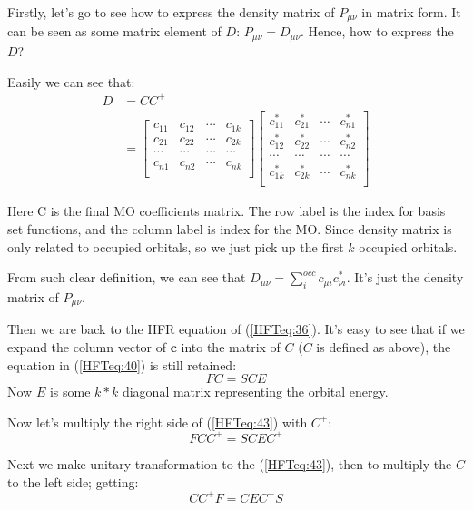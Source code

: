 Firstly, let's go to see how to express the density matrix of
$P_{\mu\nu}$ in matrix form. It can be seen as some matrix
element of $D$: $P_{\mu\nu} = D_{\mu\nu}$. Hence, how to express
the $D$?

Easily we can see that:
\begin{align}\label{}
D &= CC^{+} \nonumber \\
&=
\begin{bmatrix}
  c_{11} & c_{12} & \cdots & c_{1k} \\
  c_{21} & c_{22} & \cdots & c_{2k} \\
  \cdots & \cdots & \cdots & \cdots \\
  c_{n1} & c_{n2} & \cdots & c_{nk} \\
\end{bmatrix}
\begin{bmatrix}
  c^{*}_{11} & c^{*}_{21} & \cdots & c^{*}_{n1} \\
  c^{*}_{12} & c^{*}_{22} & \cdots & c^{*}_{n2} \\
  \cdots & \cdots & \cdots & \cdots \\
  c^{*}_{1k} & c^{*}_{2k} & \cdots & c^{*}_{nk} \\
\end{bmatrix}
\end{align}

Here C is the final MO coefficients matrix. The row label is the index for
basis set functions, and the column label is index for the MO. Since density
matrix is only related to occupied orbitals, so we just pick up the first $k$
occupied orbitals.

From such clear definition, we can see that $D_{\mu\nu} =
\sum_{i}^{occ}c_{\mu i}c^{*}_{\nu i}$. It's just the density matrix
of $P_{\mu\nu}$.

Then we are back to the HFR equation of (\ref{HFTeq:36}). It's easy
to see that if we expand the column vector of $\bm{c}$ into the matrix of
$C$ ($C$ is defined as above), the equation in (\ref{HFTeq:40}) is still
retained:
\begin{equation}\label{HFTeq:43}
FC = SCE
\end{equation}
Now $E$ is some $k*k$ diagonal matrix representing the orbital energy.

Now let's multiply the right side of (\ref{HFTeq:43}) with $C^{+}$:
\begin{equation}\label{HF_density_matrix:eq:1}
FCC^{+} = SCEC^{+} 
\end{equation}

Next we make unitary transformation to the (\ref{HFTeq:43}), then to
multiply the $C$ to the left side; getting:
\begin{equation}\label{HF_density_matrix:eq:2}
CC^{+}F = CEC^{+}S 
\end{equation}

